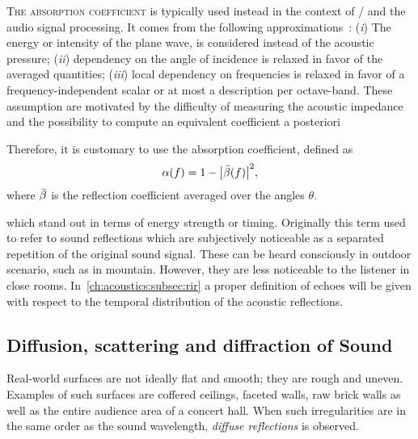 \textsc{The absorption coefficient} is typically used instead in the context of \GA/ and the audio signal processing.
It comes from the following approximations~:
(\textit{i}) The energy or intensity of the plane wave, is considered instead of the acoustic pressure;
(\textit{ii}) dependency on the angle of incidence is relaxed in favor of the averaged quantities;
(\textit{iii}) local dependency on frequencies is relaxed in favor of a frequency-independent scalar or at most a description per octave-band.
These assumption are motivated by the difficulty of measuring the acoustic impedance
and the possibility to compute an equivalent coefficient a posteriori

Therefore, it is customary to use the absorption coefficient, defined as
\begin{equation}
    \absCoeff(f) = 1 - \abs{\bar{\reflCoeff}(f)}^2
    ,
\end{equation}
where $\bar{\beta}$ is the reflection coefficient averaged over the angles $\theta$.

 which stand out in terms of energy strength or timing.
Originally this term used to refer to sound reflections which are subjectively noticeable as a separated repetition of the original sound signal.
These can be heard consciously in outdoor scenario, such as in mountain. However, they are less noticeable to the listener in close rooms.
In~\cref{ch:acoustics:subsec:rir} a proper definition of echoes will be given with respect to the temporal distribution of the acoustic reflections.

\subsection{Diffusion, scattering and diffraction of Sound}
Real-world surfaces are not ideally flat and smooth; they are rough and uneven.
Examples of such surfaces are coffered ceilings, faceted walls, raw brick walls as well as the entire audience area of a concert hall.
When such irregularities are in the same order as the sound wavelength, \textit{diffuse reflections} is observed.

